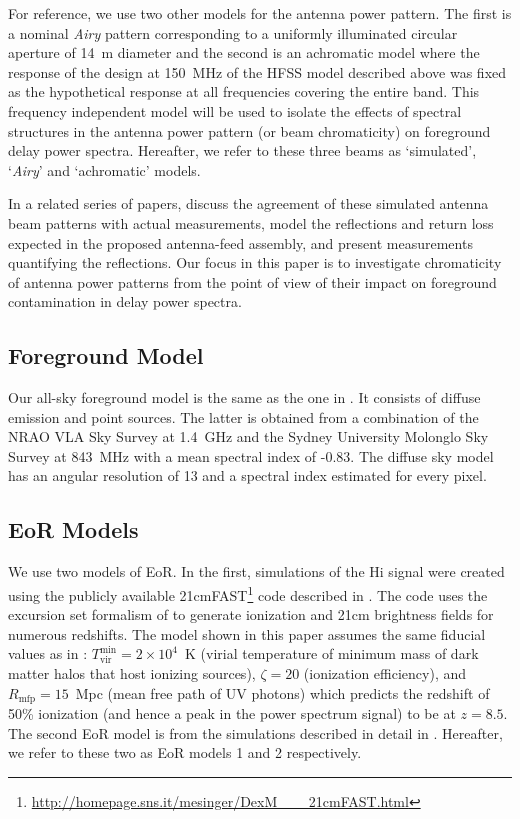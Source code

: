 \documentclass[preprint2,iop,numberedappendix,twocolappendix,appendixfloats]{emulateapj}
\begin{document}
For reference, we use two other models for the antenna power pattern. The first is a nominal {\it Airy} pattern corresponding to a uniformly illuminated circular aperture of 14~m diameter and the second is an achromatic model where the response of the design at 150~MHz of the HFSS model described above was fixed as the hypothetical response at all frequencies covering the entire band. This frequency independent model will be used to isolate the effects of spectral structures in the antenna power pattern (or beam chromaticity) on foreground delay power spectra. Hereafter, we refer to these three beams as `simulated', `{\it Airy}' and `achromatic' models.

In a related series of papers, \citet{neb16} discuss the agreement of these simulated antenna beam patterns with actual measurements, \citet{ewa16} model the reflections and return loss expected in the proposed antenna-feed assembly, and \citet{pat16} present measurements quantifying the reflections. Our focus in this paper is to investigate chromaticity of antenna power patterns from the point of view of their impact on foreground contamination in delay power spectra.

\subsection{Foreground Model}\label{sec:foreground}

Our all-sky foreground model is the same as the one in \citet{thy15a}. It consists of diffuse emission \citep{deo08} and point sources. The latter is obtained from a combination of the NRAO VLA Sky Survey \citep[NVSS;][]{con98} at 1.4~GHz and the Sydney University Molonglo Sky Survey \citep[SUMSS;][]{boc99,mau03} at 843~MHz with a mean spectral index of -0.83. The diffuse sky model has an angular resolution of 13 and a spectral index estimated for every pixel.

\subsection{EoR Models}\label{sec:EoR-model}

We use two models of EoR. In the first, simulations of the H{\sc i} signal were created using the publicly available 21cmFAST\footnote{\url{http://homepage.sns.it/mesinger/DexM\_\_\_21cmFAST.html}} code described in \citet{mes11}. The code uses the excursion set formalism of \citet{fur04a} to generate ionization and 21cm brightness fields for numerous redshifts. The model shown in this paper assumes the same fiducial values as in \citet{ewa16}: $T_\text{vir}^\text{min} = 2 \times 10^4$~K (virial temperature of minimum mass of dark matter halos that host ionizing sources), $\zeta = 20$ (ionization efficiency), and $R_\text{mfp}=15$~Mpc (mean free path of UV photons) which predicts the redshift of 50\% ionization (and hence a peak in the power spectrum signal) to be at $z=8.5$. The second EoR model is from the simulations described in detail in \citet{lid08}. Hereafter, we refer to these two as EoR models 1 and 2 respectively. 
\end{document}
